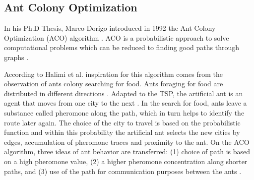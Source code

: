 \documentclass[conference]{IEEEtran}
\begin{document}
	
	\subsection{Ant Colony Optimization}
	In his Ph.D Thesis, Marco Dorigo introduced in 1992 the Ant Colony Optimization (ACO) algorithm \cite{halim2019combinatorial, abraham2007swarm}. ACO is a probabilistic approach to solve computational problems which can be reduced to finding good paths through graphs \cite{abraham2007swarm}. 
	
	According to Halimi et al. \cite{halim2019combinatorial} inspiration for this algorithm comes from the observation of ants colony searching for food. Ants foraging for food are distributed in different directions \cite{messac2015optimization}. 
	Adapted to the TSP, the artificial ant is an agent that moves from one city to the next \cite{halim2019combinatorial}. In the search for food, ants leave a substance called pheromone along the path, which in turn helps to identify the route later again. The choice of the city to travel is based on the probabilistic function and within this probability the artificial ant selects the new cities by edges, accumulation of pheromone traces and proximity to the ant. On the ACO algorithm, three ideas of ant behavior are transferred: (1) choice of path is based on a high pheromone value, (2) a higher pheromone concentration along shorter paths, and (3) use of the path for communication purposes between the ants \cite{halim2019combinatorial}. 
	
	


\end{document}
